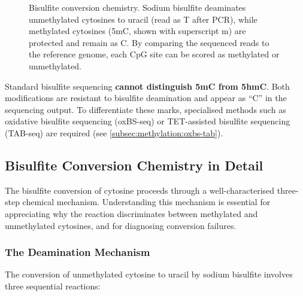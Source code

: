 \begin{figure}[htbp]
\begin{tikzpicture}
\end{tikzpicture}
\caption[Bisulfite conversion chemistry for methylation detection.]{Bisulfite conversion chemistry. Sodium bisulfite deaminates unmethylated cytosines to uracil (read as T after PCR), while methylated cytosines (5mC, shown with superscript m) are protected and remain as C. By comparing the sequenced reads to the reference genome, each CpG site can be scored as methylated or unmethylated.}
\label{fig:methylation:bisulfite-chemistry}
\end{figure}

\begin{warningbox}
Standard bisulfite sequencing \textbf{cannot distinguish 5mC from 5hmC}. Both modifications are resistant to bisulfite deamination and appear as ``C'' in the sequencing output. To differentiate these marks, specialised methods such as oxidative bisulfite sequencing (oxBS-seq) or TET-assisted bisulfite sequencing (TAB-seq) are required (see \cref{subsec:methylation:oxbs-tab}).
\end{warningbox}

\subsection{Bisulfite Conversion Chemistry in Detail}
\label{subsec:methylation:bisulfite-chemistry}

The bisulfite conversion of cytosine proceeds through a well-characterised three-step chemical mechanism. Understanding this mechanism is essential for appreciating why the reaction discriminates between methylated and unmethylated cytosines, and for diagnosing conversion failures.

\subsubsection{The Deamination Mechanism}

The conversion of unmethylated cytosine to uracil by sodium bisulfite involves three sequential reactions:

